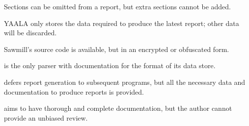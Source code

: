 \begin{table}[thbp]
    \begin{eqlist}

        \item [\dag{}] Sections can be omitted from a report, but extra
            sections cannot be added.

        \item [\ddag{}] YAALA only stores the data required to produce the
            latest report; other data will be discarded.

        \item [\nialpha{}] Sawmill's source code is available, but in an
            encrypted or obfuscated form.

        \item [\nibeta{}] \parsername{} is the only parser with
            documentation for the format of its data store.

        \item [\nichi{}] \parsername{} defers report generation to
            subsequent programs, but all the necessary data and
            documentation to produce reports is provided.

        \item [\niepsilon{}] \parsername{} aims to have thorough and
            complete documentation, but the author cannot provide an
            unbiased review.

    \end{eqlist}

\end{table}

\clearpage{}
